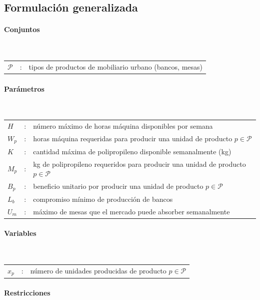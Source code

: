 \subsection{Formulación generalizada}

\paragraph{Conjuntos}\mbox{}\\
\begin{tabular}{l c l}
    $\mathcal{P}$  & : & tipos de productos de mobiliario urbano (bancos, mesas) \\
\end{tabular}

\paragraph{Parámetros}\mbox{}\\
\begin{tabular}{l c l}
    $H$  & : & número máximo de horas máquina disponibles por semana \\
    $W_p$  & : & horas máquina requeridas para producir una unidad de producto $p \in \mathcal{P}$ \\
    $K$  & : & cantidad máxima de polipropileno disponible semanalmente (kg) \\
    $M_p$  & : & kg de polipropileno requeridos para producir una unidad de producto $p \in \mathcal{P}$ \\
    $B_p$  & : & beneficio unitario por producir una unidad de producto $p \in \mathcal{P}$ \\
    $L_b$  & : & compromiso mínimo de producción de bancos \\
    $U_m$  & : & máximo de mesas que el mercado puede absorber semanalmente \\
\end{tabular}

\paragraph{Variables}\mbox{}\\
\begin{tabular}{l c l}
    $x_p$  & : & número de unidades producidas de producto $p \in \mathcal{P}$ \\
\end{tabular}

\paragraph{Restricciones}\mbox{}\\

